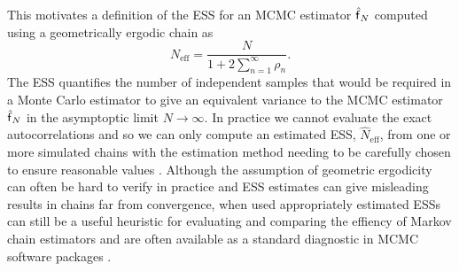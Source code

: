 This motivates a definition of the \ac{ESS} for an \ac{MCMC} estimator $\hatf_N$ computed using a geometrically ergodic chain as
\begin{equation}\label{eq:effective-sample-size-mcmc}
  N_{\textrm{eff}} = \frac{N}{1 + 2\sum_{n=1}^\infty \rho_n}.
\end{equation} 
The \ac{ESS} quantifies the number of independent samples that would be required in a Monte Carlo estimator to give an equivalent variance to the \ac{MCMC} estimator $\hatf_N$ in the asymptoptic limit $N \to \infty$. In practice we cannot evaluate the exact autocorrelations and so we can only compute an estimated \ac{ESS}, $\hat{N}_{\textrm{eff}}$, from one or more simulated chains with the estimation method needing to be carefully chosen to ensure reasonable values \citep{thompson2010comparison}. Although the assumption of geometric ergodicity can often be hard to verify in practice and \ac{ESS} estimates can give misleading results in chains far from convergence, when used appropriately estimated \acp{ESS} can still be a useful heuristic for evaluating and comparing the effiency of Markov chain estimators and are often available as a standard diagnostic in \ac{MCMC} software packages \citep{plummer2006coda,carpenter2016stan,salvatier2016probabilistic}.


